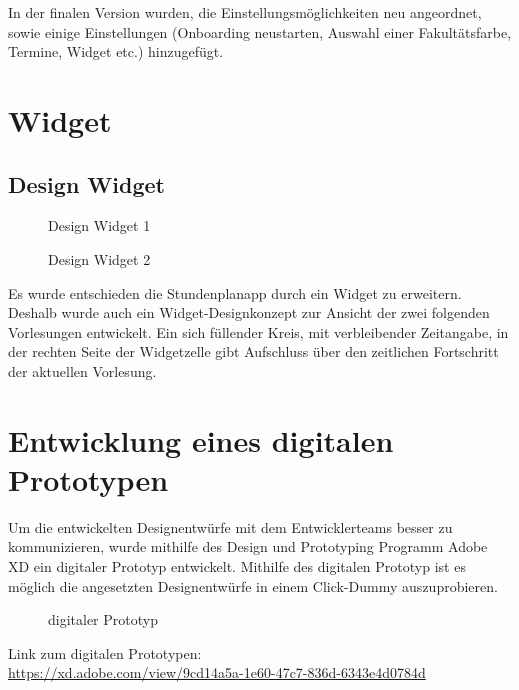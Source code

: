 In der finalen Version wurden, die Einstellungsmöglichkeiten neu angeordnet, sowie einige Einstellungen (Onboarding neustarten, Auswahl einer Fakultätsfarbe, Termine, Widget etc.) hinzugefügt.

\section{Widget}

\subsection{Design Widget}
\begin{figure}[H]
	\centering
	\caption{Design  Widget 1}
	\label{fig1}
\end{figure}

\begin{figure}[H]
	\centering
	\caption{Design Widget 2}
	\label{fig1}
\end{figure}

Es wurde entschieden die Stundenplanapp durch ein Widget zu erweitern. Deshalb wurde auch ein Widget-Designkonzept zur Ansicht der zwei folgenden Vorlesungen entwickelt. Ein sich füllender Kreis, mit verbleibender Zeitangabe, in der rechten Seite der Widgetzelle gibt Aufschluss über den zeitlichen Fortschritt der aktuellen Vorlesung.


\section{Entwicklung eines digitalen Prototypen}
Um die entwickelten Designentwürfe mit dem Entwicklerteams besser zu kommunizieren, wurde mithilfe des Design und Prototyping Programm Adobe XD ein digitaler Prototyp entwickelt. Mithilfe des digitalen Prototyp ist es möglich die angesetzten Designentwürfe in einem Click-Dummy auszuprobieren.

\begin{figure}[H]
	\centering
	\caption{digitaler Prototyp}
	\label{fig1}
\end{figure}

Link zum digitalen Prototypen:\\
\url{https://xd.adobe.com/view/9cd14a5a-1e60-47c7-836d-6343e4d0784d}

